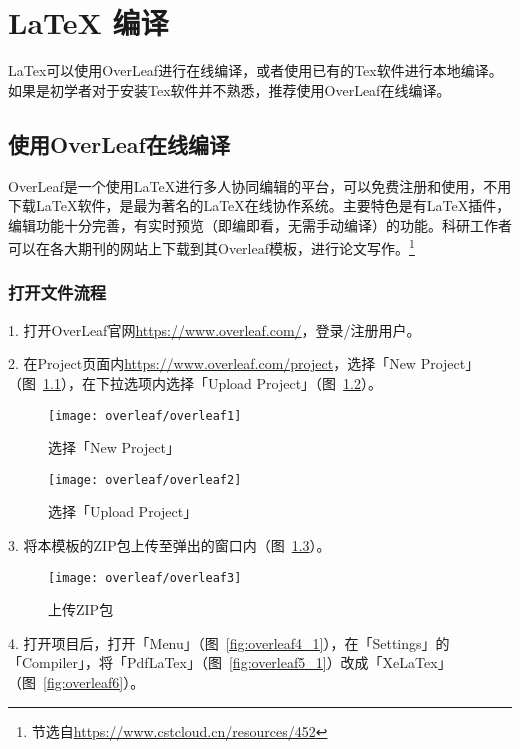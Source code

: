 
\chapter{\LaTeX{} 编译}

LaTex可以使用OverLeaf进行在线编译，或者使用已有的Tex软件进行本地编译。如果是初学者对于安装Tex软件并不熟悉，推荐使用OverLeaf在线编译。

\section{使用OverLeaf在线编译}

OverLeaf是一个使用LaTeX进行多人协同编辑的平台，可以免费注册和使用，不用下载LaTeX软件，是最为著名的LaTeX在线协作系统。主要特色是有LaTeX插件，编辑功能十分完善，有实时预览（即编即看，无需手动编译）的功能。科研工作者可以在各大期刊的网站上下载到其Overleaf模板，进行论文写作。\footnote{节选自\url{https://www.cstcloud.cn/resources/452}}

\subsection{打开文件流程}

1. 打开OverLeaf官网\url{https://www.overleaf.com/}，登录/注册用户。

2. 在Project页面内\url{https://www.overleaf.com/project}，选择「New Project」（图~\ref{fig:overleaf1}），在下拉选项内选择「Upload Project」（图~\ref{fig:overleaf2}）。

\begin{figure}
	\centering
	\texttt{[image: overleaf/overleaf1]}
	\caption{选择「New Project」}
	\label{fig:overleaf1}
\end{figure}

\begin{figure}
	\centering
	\texttt{[image: overleaf/overleaf2]}
	\caption{选择「Upload Project」}
	\label{fig:overleaf2}
\end{figure}

3. 将本模板的ZIP包上传至弹出的窗口内（图~\ref{fig:overleaf3}）。

\begin{figure}
	\centering
	\texttt{[image: overleaf/overleaf3]}
	\caption{上传ZIP包}
	\label{fig:overleaf3}
\end{figure}

4. 打开项目后，打开「Menu」（图~\ref{fig:overleaf4_1}），在「Settings」的「Compiler」，将「PdfLaTex」（图~\ref{fig:overleaf5_1}）改成「XeLaTex」（图~\ref{fig:overleaf6}）。

